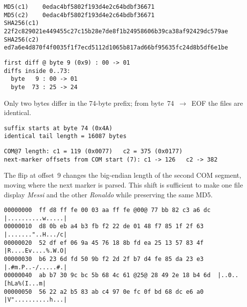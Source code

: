 \documentclass[runningheads]{llncs}
\begin{document}
    \begin{lstlisting}[style=hashblock,caption={Hashes for the reusable JPEG pair}]
MD5(c1)    0edac4bf5802f193d4e2c64bdbf36671
MD5(c2)    0edac4bf5802f193d4e2c64bdbf36671
SHA256(c1) 22f2c829021e449455c27c15b28e7de8f1b24958606b39ca38af92429dc579ae
SHA256(c2) ed7a6e4d870f4f0035f1f7ecd5112d1065b817ad66bf95635fc24d8b5df6e1be
    \end{lstlisting}

    \begin{lstlisting}[style=textblock,
        caption={First difference \& prefix flips},
        label={lst:firstdiff}]
first diff @ byte 9 (0x9) : 00 -> 01
diffs inside 0..73:
  byte   9 : 00 -> 01
  byte  73 : 25 -> 24
    \end{lstlisting}

    Only two bytes differ in the 74-byte prefix; from byte~74~$\rightarrow$~EOF the files are identical.

    \begin{lstlisting}[style=textblock,
        caption={Identical suffix boundary \& length},
        label={lst:suffix}]
suffix starts at byte 74 (0x4A)
identical tail length = 16087 bytes
    \end{lstlisting}

    \begin{lstlisting}[style=textblock,
        caption={Steering flip (2nd COM length) and next-marker offsets},
        label={lst:comlength}]
COM@7 length: c1 = 119 (0x0077)   c2 = 375 (0x0177)
next-marker offsets from COM start (7): c1 -> 126   c2 -> 382
    \end{lstlisting}

    The flip at offset~9 changes the big-endian length of the second COM segment, moving where the next marker is parsed. This shift is sufficient to make one file display \emph{Messi} and the other \emph{Ronaldo} while preserving the same MD5.

    \begin{lstlisting}[style=hexhi,caption={collision1.jpg — first 96 bytes}]
00000000  ff d8 ff fe 00 03 aa ff fe @00@ 77 bb 82 c3 a6 dc  |..........w.....|
00000010  d8 0b eb a4 b3 fb f2 22 de 01 48 f7 85 1f 2f 63  |......."..H.../c|
00000020  52 df ef 06 9a 45 76 18 8b fd ea 25 13 57 83 4f  |R....Ev....%.W.O|
00000030  b6 23 6d fd 50 9b f2 2d 2f b7 d4 fe 85 da 23 e3  |.#m.P..-/.....#.|
00000040  ab b7 30 9c bc 5b 68 4c 61 @25@ 28 49 2e 18 b4 6d  |..0..[hLa%(I...m|
00000050  56 22 a2 b5 83 ab c4 97 0e fc 0f bd 68 dc e6 a0  |V"..........h...|
    \end{lstlisting}
\end{document}
